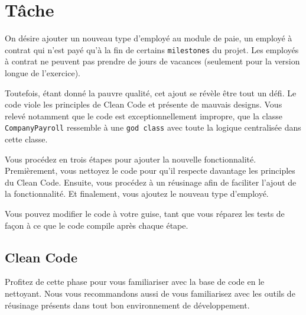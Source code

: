 \documentclass[french]{article}
\begin{document}
\section{Tâche}
On désire ajouter un nouveau type d'employé au module de paie, un employé à contrat qui n'est payé qu'à la fin de certains \texttt{milestones} du projet. Les employés à contrat ne peuvent pas prendre de jours de vacances (seulement pour la version longue de l'exercice).

Toutefois, étant donné la pauvre qualité, cet ajout se révèle être tout un défi. Le code viole les principles de Clean Code et présente de mauvais designs. Vous relevé notamment que le code est exceptionnellement impropre, que la classe \texttt{CompanyPayroll} ressemble à une \texttt{god class} avec toute la logique centralisée dans cette classe.

Vous procédez en trois étapes pour ajouter la nouvelle fonctionnalité. Premièrement, vous nettoyez le code pour qu'il respecte davantage les principles du Clean Code. Ensuite, vous procédez à un réusinage afin de faciliter l'ajout de la fonctionnalité. Et finalement, vous ajoutez le nouveau type d'employé.

Vous pouvez modifier le code à votre guise, tant que vous réparez les tests de façon à ce que le code compile après chaque étape.

\subsection{Clean Code}

Profitez de cette phase pour vous familiariser avec la base de code en le nettoyant. Nous vous recommandons aussi de vous familiarisez avec les outils de réusinage présents dans tout bon environnement de développement.


\end{document}
